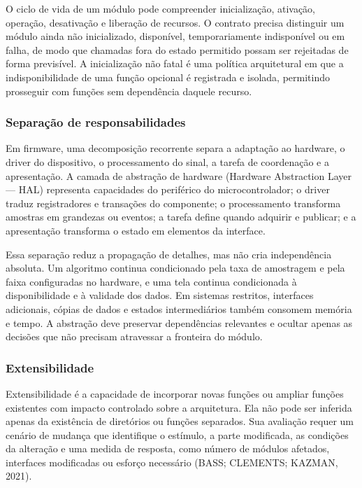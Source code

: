 \documentclass{article}
\begin{document}
O ciclo de vida de um m\'odulo pode compreender inicializa\c{c}\~ao, ativa\c{c}\~ao, opera\c{c}\~ao, desativa\c{c}\~ao e libera\c{c}\~ao de recursos. O contrato precisa distinguir um m\'odulo ainda n\~ao inicializado, dispon\'ivel, temporariamente indispon\'ivel ou em falha, de modo que chamadas fora do estado permitido possam ser rejeitadas de forma previs\'ivel. A inicializa\c{c}\~ao n\~ao fatal \'e uma pol\'itica arquitetural em que a indisponibilidade de uma fun\c{c}\~ao opcional \'e registrada e isolada, permitindo prosseguir com fun\c{c}\~oes sem depend\^encia daquele recurso.


\subsubsection{Separa\c{c}\~ao de responsabilidades}


Em firmware, uma decomposi\c{c}\~ao recorrente separa a adapta\c{c}\~ao ao hardware, o driver do dispositivo, o processamento do sinal, a tarefa de coordena\c{c}\~ao e a apresenta\c{c}\~ao. A camada de abstra\c{c}\~ao de hardware (Hardware Abstraction Layer --- HAL) representa capacidades do perif\'erico do microcontrolador; o driver traduz registradores e transa\c{c}\~oes do componente; o processamento transforma amostras em grandezas ou eventos; a tarefa define quando adquirir e publicar; e a apresenta\c{c}\~ao transforma o estado em elementos da interface.


Essa separa\c{c}\~ao reduz a propaga\c{c}\~ao de detalhes, mas n\~ao cria independ\^encia absoluta. Um algoritmo continua condicionado pela taxa de amostragem e pela faixa configuradas no hardware, e uma tela continua condicionada \`a disponibilidade e \`a validade dos dados. Em sistemas restritos, interfaces adicionais, c\'opias de dados e estados intermedi\'arios tamb\'em consomem mem\'oria e tempo. A abstra\c{c}\~ao deve preservar depend\^encias relevantes e ocultar apenas as decis\~oes que n\~ao precisam atravessar a fronteira do m\'odulo.


\subsubsection{Extensibilidade}


Extensibilidade \'e a capacidade de incorporar novas fun\c{c}\~oes ou ampliar fun\c{c}\~oes existentes com impacto controlado sobre a arquitetura. Ela n\~ao pode ser inferida apenas da exist\^encia de diret\'orios ou fun\c{c}\~oes separados. Sua avalia\c{c}\~ao requer um cen\'ario de mudan\c{c}a que identifique o est\'imulo, a parte modificada, as condi\c{c}\~oes da altera\c{c}\~ao e uma medida de resposta, como n\'umero de m\'odulos afetados, interfaces modificadas ou esfor\c{c}o necess\'ario (BASS; CLEMENTS; KAZMAN, 2021).
\end{document}

